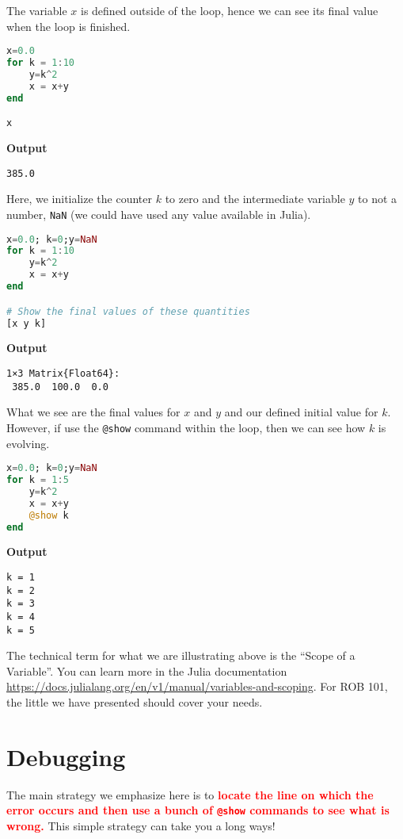 The variable $x$ is defined outside of the loop, hence we can see its final value when the loop is finished.
\begin{lstlisting}[language=Julia,style=mystyle]
x=0.0
for k = 1:10
    y=k^2
    x = x+y
end

x
\end{lstlisting}
\textbf{Output} 
\begin{verbatim}
385.0
\end{verbatim}

Here, we initialize the counter $k$ to zero and the intermediate variable $y$ to not a number, \texttt{NaN} (we could have used any value available in Julia). 

\begin{lstlisting}[language=Julia,style=mystyle]
x=0.0; k=0;y=NaN
for k = 1:10
    y=k^2
    x = x+y
end

# Show the final values of these quantities
[x y k]
\end{lstlisting}
\textbf{Output} 
\begin{verbatim}
1×3 Matrix{Float64}:
 385.0  100.0  0.0
\end{verbatim}

What we see are the final values for $x$ and $y$ and our defined initial value for $k$. However, if use the \texttt{@show} command within the loop, then we can see how $k$ is evolving.

\begin{lstlisting}[language=Julia,style=mystyle]
x=0.0; k=0;y=NaN
for k = 1:5
    y=k^2
    x = x+y
    @show k
end
\end{lstlisting}
\textbf{Output} 
\begin{verbatim}
k = 1
k = 2
k = 3
k = 4
k = 5
\end{verbatim}

\begin{tcolorbox}[title={\bf \large Scope of a Variable}]

The technical term for what we are illustrating above is the ``Scope of a Variable''. You can learn more in the Julia documentation \url{https://docs.julialang.org/en/v1/manual/variables-and-scoping}. For ROB 101, the little we have presented should cover your needs. 
\end{tcolorbox}

\section{Debugging}

The main strategy we emphasize here is to \textcolor{red}{\bf locate the line on which the error occurs and then use a bunch of \texttt{@show} commands to see what is wrong.} This simple strategy can take you a long ways! 

